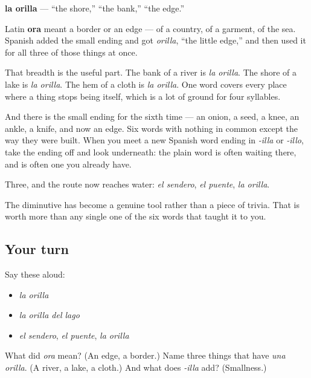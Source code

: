 \begin{cousinweb}
\textbf{la orilla} — \textquotedblleft{}the shore,\textquotedblright{} \textquotedblleft{}the bank,\textquotedblright{} \textquotedblleft{}the edge.\textquotedblright{}

Latin \textbf{ora} meant a border or an edge — of a country, of a garment, of the sea. Spanish added the small ending and got \emph{orilla}, \textquotedblleft{}the little edge,\textquotedblright{} and then used it for all three of those things at once.

That breadth is the useful part. The bank of a river is \emph{la orilla}. The shore of a lake is \emph{la orilla}. The hem of a cloth is \emph{la orilla}. One word covers every place where a thing stops being itself, which is a lot of ground for four syllables.

And there is the small ending for the sixth time — an onion, a seed, a knee, an ankle, a knife, and now an edge. Six words with nothing in common except the way they were built. When you meet a new Spanish word ending in \emph{-illa} or \emph{-illo}, take the ending off and look underneath: the plain word is often waiting there, and is often one you already have.
\end{cousinweb}

\begin{grammarlens}[title={What you've built}]
Three, and the route now reaches water: \emph{el sendero}, \emph{el puente}, \emph{la orilla}.

The diminutive has become a genuine tool rather than a piece of trivia. That is worth more than any single one of the six words that taught it to you.
\end{grammarlens}

\subsection*{Your turn}
Say these aloud:

\begin{itemize}
\raggedright
  \item \emph{la orilla}
  \item \emph{la orilla del lago}
  \item \emph{el sendero}, \emph{el puente}, \emph{la orilla}
\end{itemize}

\begin{tcolorbox}[breakable,colback=teal!4,colframe=teal!35!black,title={Before you move on}]
What did \emph{ora} mean? (An edge, a border.) Name three things that have \emph{una orilla}. (A river, a lake, a cloth.) And what does \emph{-illa} add? (Smallness.)
\end{tcolorbox}
